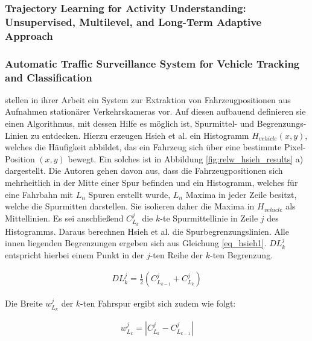 \subsubsection*{Trajectory Learning for Activity Understanding: Unsupervised, Multilevel, and Long-Term Adaptive Approach}


\subsubsection*{Automatic Traffic Surveillance System for Vehicle Tracking and Classification}

\cite[]{Hsieh2006} stellen in ihrer Arbeit ein System zur Extraktion von Fahrzeugpositionen aus Aufnahmen
stationärer Verkehrskameras vor. Auf diesen aufbauend definieren sie einen Algorithmus, mit dessen Hilfe es
möglich ist, Spurmittel- und Begrenzungs-Linien zu entdecken.
Hierzu erzeugen Hsieh et al. ein Histogramm $H_{vehicle}(x,y)$, welches die Häufigkeit abbildet, das ein Fahrzeug sich über eine
bestimmte Pixel-Position $(x, y)$ bewegt. Ein solches ist in Abbildung \ref{fig:relw_hsieh_results} a) dargestellt.
Die Autoren gehen davon aus, dass die Fahrzeugpositionen sich mehrheitlich in der Mitte einer Spur befinden und
ein Histogramm, welches für eine Fahrbahn mit $L_n$ Spuren erstellt wurde, $L_n$ Maxima in jeder Zeile besitzt,
welche die Spurmitten darstellen.
Sie isolieren daher die Maxima in $H_{vehicle}$ als Mittellinien. Es sei anschließend $C_{L_k}^{j}$ die $k$-te Spurmittellinie
in Zeile $j$ des Histogramms. Daraus berechnen Hsieh et al. die Spurbegrenzungslinien. Alle innen liegenden
Begrenzungen ergeben sich aus Gleichung \ref{eq_hsieh1}. $DL_{k}^{j}$ entspricht hierbei einem Punkt
in der $j$-ten Reihe der $k$-ten Begrenzung.

\begin{ceqn}
\begin{align}
\label{eq_hsieh1}
    DL_{k}^{j} = \frac{1}{2} (C_{L_{k-1}}^{j} + C_{L_{k}}^{j})
\end{align}
\end{ceqn}

Die Breite $w_{L_k}^{j}$ der $k$-ten Fahrspur ergibt sich zudem wie folgt:

\begin{ceqn}
\begin{align}
\label{eq_hsieh2}
    w_{L_k}^{j} = | C_{L_{k}}^{j} - C_{L_{k-1}}^{j} |
\end{align}
\end{ceqn}

